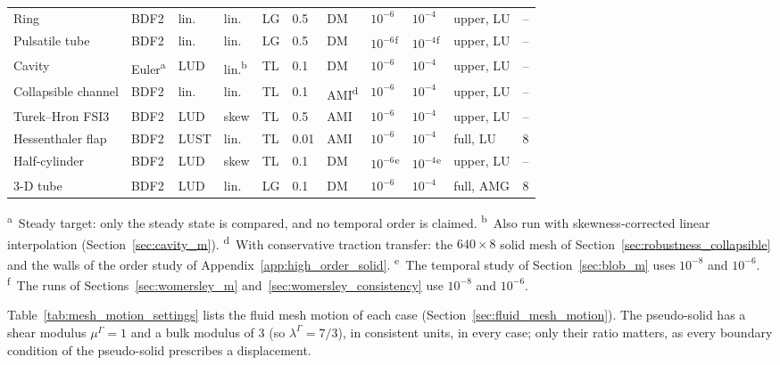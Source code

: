 \begin{table}[htbp]
\begin{tabular}{lllllllllll}
		\midrule
		Ring & BDF2  & lin. & lin.  & LG & 0.5 & DM & $10^{-6}$ & $10^{-4}$ & upper, LU & -- \\
		Pulsatile tube & BDF2  & lin. & lin.  & LG & 0.5 & DM & $10^{-6}$\textsuperscript{f} & $10^{-4}$\textsuperscript{f} & upper, LU & -- \\
		Cavity & Euler\textsuperscript{a} & LUD & lin.\textsuperscript{b} & TL & 0.1 & DM & $10^{-6}$ & $10^{-4}$ & upper, LU & -- \\
		Collapsible channel & BDF2  & lin. & lin.  & TL & 0.1 & AMI\textsuperscript{d} & $10^{-6}$ & $10^{-4}$ & upper, LU & -- \\
		Turek--Hron FSI3 & BDF2  & LUD  & skew  & TL & 0.5 & AMI & $10^{-6}$ & $10^{-4}$ & upper, LU & -- \\
		Hessenthaler flap & BDF2  & LUST & lin.  & TL & 0.01 & AMI & $10^{-6}$ & $10^{-4}$ & full, LU & 8 \\
		Half-cylinder & BDF2  & LUD  & skew  & TL & 0.1 & DM & $10^{-6}$\textsuperscript{e} & $10^{-4}$\textsuperscript{e} & upper, LU & -- \\
		3-D tube & BDF2  & LUD  & lin.  & LG & 0.1 & DM & $10^{-6}$ & $10^{-4}$ & full, AMG & 8 \\
		\bottomrule
	\end{tabular}
	\par\smallskip
	\parbox{0.95\linewidth}{\footnotesize
	\textsuperscript{a}~Steady target: only the steady state is compared, and no temporal order is claimed.
	\textsuperscript{b}~Also run with skewness-corrected linear interpolation (Section~\ref{sec:cavity_m}).
	\textsuperscript{d}~With conservative traction transfer: the $640\times8$ solid mesh of Section~\ref{sec:robustness_collapsible} and the walls of the order study of Appendix~\ref{app:high_order_solid}.
	\textsuperscript{e}~The temporal study of Section~\ref{sec:blob_m} uses $10^{-8}$ and $10^{-6}$.
	\textsuperscript{f}~The runs of Sections~\ref{sec:womersley_m} and~\ref{sec:womersley_consistency} use $10^{-8}$ and $10^{-6}$.
}
\end{table}

Table~\ref{tab:mesh_motion_settings} lists the fluid mesh motion of each case (Section~\ref{sec:fluid_mesh_motion}).
The pseudo-solid has a shear modulus $\mu^\Gamma = 1$ and a bulk modulus of $3$ (so $\lambda^\Gamma = 7/3$), in consistent units, in every case; only their ratio matters, as every boundary condition of the pseudo-solid prescribes a displacement.


